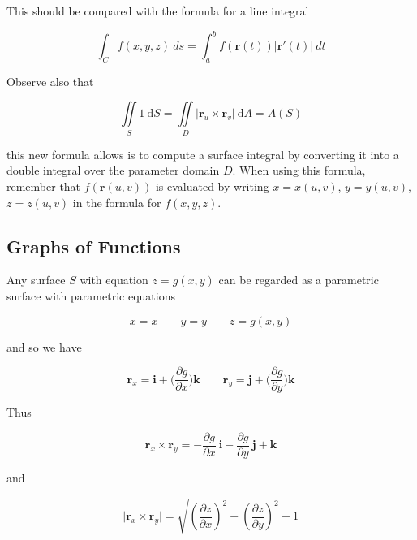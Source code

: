 \documentclass{article}
\begin{document}
This should be compared with the formula for a line integral 

\begin{equation*}
    \int_C f(x,y,z) \ ds = \int_{a}^{b} f(\mathbf{r}(t)) \rvert \mathbf{r}'(t) \rvert \ dt
\end{equation*}

Observe also that 

\begin{equation*}
    \iint\limits_{S} 1 \ \mathrm{d}S = \iint\limits_{D} \rvert \mathbf{r}_u  \times \mathbf{r}_v  \rvert \ \mathrm{d}A = A(S)
\end{equation*}

this new formula allows is to compute a surface integral by converting it into a double integral over the parameter domain $D$. When using this formula, remember that $f(\mathbf{r}(u,v))$ is evaluated by writing $x = x(u,v)$, $y = y(u,v)$, $z = z(u,v)$ in the formula for $f(x,y,z)$.



\subsection{Graphs of Functions}

Any surface $S$ with equation $z = g(x,y)$ can be regarded as a parametric surface with parametric equations

\begin{equation*}
    x = x \qquad y = y \qquad z = g(x,y)
\end{equation*}

and so we have 

\begin{equation*}
    \mathbf{r}_x = \mathbf{i} + \bigg( \frac{\partial g}{\partial x} \bigg) \mathbf{k} \qquad \mathbf{r}_y = \mathbf{j} + \bigg(  \frac{\partial g}{\partial y}\bigg) \mathbf{k}
\end{equation*}

Thus

\begin{equation*}
    \mathbf{r}_x  \times \mathbf{r}_y = - \frac{\partial g }{\partial x} \ \mathbf{i} - \frac{\partial g}{\partial y} \ \mathbf{j} + \mathbf{k} 
\end{equation*}

and 

\begin{equation*}
    \bigg\rvert \mathbf{r}_x \times \mathbf{r}_y \bigg\rvert = \sqrt{(\frac{\partial z}{\partial x})^2 + (\frac{\partial z}{\partial y})^2 + 1}
\end{equation*}
\end{document}
